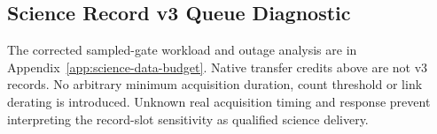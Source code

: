\subsection{Science Record v3 Queue Diagnostic}\label{app:v3-queue}
The corrected sampled-gate workload and outage analysis are in Appendix~\ref{app:science-data-budget}. Native transfer credits above are not v3 records. No arbitrary minimum acquisition duration, count threshold or link derating is introduced. Unknown real acquisition timing and response prevent interpreting the record-slot sensitivity as qualified science delivery.
